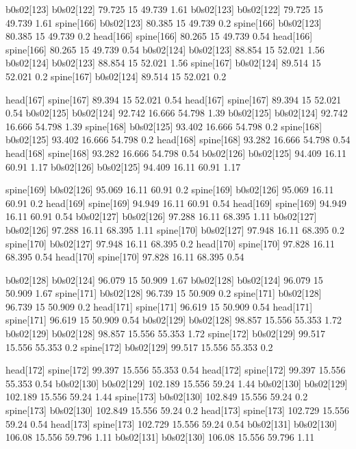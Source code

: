 b0s02[123]    b0s02[122]    79.725    15    49.739    1.61
b0s02[123]    b0s02[122]    79.725    15    49.739    1.61
spine[166]    b0s02[123]    80.385    15    49.739    0.2
spine[166]    b0s02[123]    80.385    15    49.739    0.2
head[166]    spine[166]    80.265    15    49.739    0.54
head[166]    spine[166]    80.265    15    49.739    0.54
b0s02[124]    b0s02[123]    88.854    15    52.021    1.56
b0s02[124]    b0s02[123]    88.854    15    52.021    1.56
spine[167]    b0s02[124]    89.514    15    52.021    0.2
spine[167]    b0s02[124]    89.514    15    52.021    0.2


head[167]    spine[167]    89.394    15    52.021    0.54
head[167]    spine[167]    89.394    15    52.021    0.54
b0s02[125]    b0s02[124]    92.742    16.666    54.798    1.39
b0s02[125]    b0s02[124]    92.742    16.666    54.798    1.39
spine[168]    b0s02[125]    93.402    16.666    54.798    0.2
spine[168]    b0s02[125]    93.402    16.666    54.798    0.2
head[168]    spine[168]    93.282    16.666    54.798    0.54
head[168]    spine[168]    93.282    16.666    54.798    0.54
b0s02[126]    b0s02[125]    94.409    16.11    60.91    1.17
b0s02[126]    b0s02[125]    94.409    16.11    60.91    1.17


spine[169]    b0s02[126]    95.069    16.11    60.91    0.2
spine[169]    b0s02[126]    95.069    16.11    60.91    0.2
head[169]    spine[169]    94.949    16.11    60.91    0.54
head[169]    spine[169]    94.949    16.11    60.91    0.54
b0s02[127]    b0s02[126]    97.288    16.11    68.395    1.11
b0s02[127]    b0s02[126]    97.288    16.11    68.395    1.11
spine[170]    b0s02[127]    97.948    16.11    68.395    0.2
spine[170]    b0s02[127]    97.948    16.11    68.395    0.2
head[170]    spine[170]    97.828    16.11    68.395    0.54
head[170]    spine[170]    97.828    16.11    68.395    0.54


b0s02[128]    b0s02[124]    96.079    15    50.909    1.67
b0s02[128]    b0s02[124]    96.079    15    50.909    1.67
spine[171]    b0s02[128]    96.739    15    50.909    0.2
spine[171]    b0s02[128]    96.739    15    50.909    0.2
head[171]    spine[171]    96.619    15    50.909    0.54
head[171]    spine[171]    96.619    15    50.909    0.54
b0s02[129]    b0s02[128]    98.857    15.556    55.353    1.72
b0s02[129]    b0s02[128]    98.857    15.556    55.353    1.72
spine[172]    b0s02[129]    99.517    15.556    55.353    0.2
spine[172]    b0s02[129]    99.517    15.556    55.353    0.2


head[172]    spine[172]    99.397    15.556    55.353    0.54
head[172]    spine[172]    99.397    15.556    55.353    0.54
b0s02[130]    b0s02[129]    102.189    15.556    59.24    1.44
b0s02[130]    b0s02[129]    102.189    15.556    59.24    1.44
spine[173]    b0s02[130]    102.849    15.556    59.24    0.2
spine[173]    b0s02[130]    102.849    15.556    59.24    0.2
head[173]    spine[173]    102.729    15.556    59.24    0.54
head[173]    spine[173]    102.729    15.556    59.24    0.54
b0s02[131]    b0s02[130]    106.08    15.556    59.796    1.11
b0s02[131]    b0s02[130]    106.08    15.556    59.796    1.11


